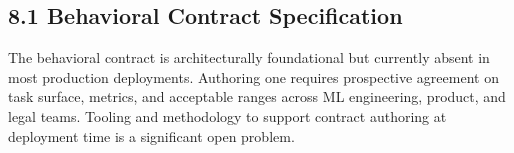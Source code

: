 \subsection{8.1  Behavioral Contract Specification}

The behavioral contract is architecturally foundational but currently absent in most production deployments. Authoring one requires prospective agreement on task surface, metrics, and acceptable ranges across ML engineering, product, and legal teams. Tooling and methodology to support contract authoring at deployment time is a significant open problem.

